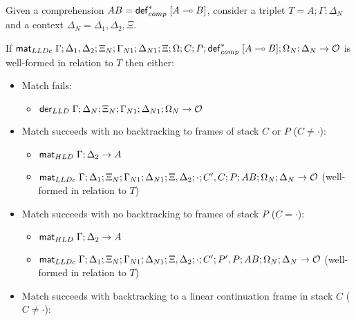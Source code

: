 \begin{lemma}\label{thm:comprehension_body_match}
Given a comprehension $AB = \mathsf{def}_{comp}^{*} \; [A \multimap B]$, consider a triplet $T = A; \Gamma; \Delta_{N}$ and a context $\Delta_{N} = \Delta_1, \Delta_2, \Xi$.

If $\mathsf{mat}_{LLDc} \; \Gamma; \Delta_1, \Delta_2; \Xi_N; \Gamma_{N1}; \Delta_{N1}; \Xi;
\Omega; C; P; \mathsf{def}_{comp}^{*} \; [A \multimap B]; \Omega_N; \Delta_N \rightarrow \mathcal{O}$ is well-formed in relation to $T$ then either:

   \begin{itemize}[leftmargin=*]
      \item Match fails:
      \begin{itemize}[leftmargin=\secondm]
         \item $\mathsf{der}_{LLD} \; \Gamma; \Delta_N; \Xi_N; \Gamma_{N1}; \Delta_{N1}; \Omega_N \rightarrow \mathcal{O}$
      \end{itemize}
      
      \item Match succeeds with no backtracking to frames of stack $C$ or $P$
      ($C \neq \cdot$):

      \begin{itemize}[leftmargin=\secondm]
         \item $\mathsf{mat}_{HLD} \; \Gamma; \Delta_2 \rightarrow A$
         \item $\mathsf{mat}_{LLDc} \; \Gamma; \Delta_1; \Xi_N; \Gamma_{N1}; \Delta_{N1}; \Xi,
            \Delta_2; \cdot; C', C; P; AB; \Omega_N; \Delta_N
            \rightarrow \mathcal{O}$ (well-formed in relation to
                  $T$)
      \end{itemize}

      \item Match succeeds with no backtracking to frames of stack $P$ ($C =
            \cdot$):
      \begin{itemize}[leftmargin=\secondm]
         \item $\mathsf{mat}_{HLD} \; \Gamma; \Delta_2 \rightarrow A$
         \item $\mathsf{mat}_{LLDc} \; \Gamma; \Delta_1; \Xi_N; \Gamma_{N1}; \Delta_{N1}; \Xi,
            \Delta_2; \cdot; C'; P', P; AB; \Omega_N; \Delta_N
            \rightarrow \mathcal{O}$ (well-formed in relation to
                  $T$)
      \end{itemize}

      \item Match succeeds with backtracking to a linear continuation frame in
      stack $C$ ($C \neq \cdot$):


\end{itemize}
\end{lemma}
